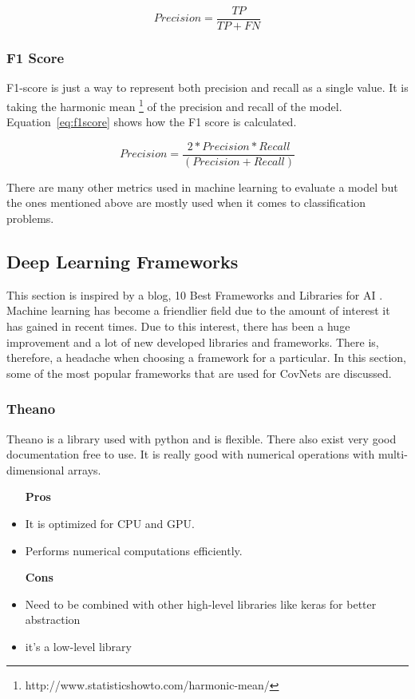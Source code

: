 \documentclass[12pt, a4paper,oneside]{report}
\begin{document}
\begin{equation}
Precision = \frac{TP}{TP + FN} \label{eq:recall}
\end{equation}

\subsubsection{F1 Score}
F1-score is just a way to represent both precision and recall as a single value. It is taking the harmonic mean \footnote{http://www.statisticshowto.com/harmonic-mean/} of the precision and recall of the model. Equation~\ref{eq:f1score} shows how the F1 score is calculated.

\begin{equation}
Precision = \frac{2 * Precision * Recall}{(Precision + Recall)} \label{eq:f1score}
\end{equation}

There are many other metrics used in machine learning to evaluate a model but the ones mentioned above are mostly used when it comes to classification problems.


\subsection{Deep Learning Frameworks}
This section is inspired by a blog, 10 Best Frameworks and Libraries for AI \cite{framework}.
Machine learning has become a friendlier field due to the amount of interest it has gained in recent times. Due to this interest, there has been a huge improvement and a lot of new developed libraries and frameworks. There is, therefore, a headache when choosing a framework for a particular. In this section, some of the most popular frameworks that are used for CovNets are discussed. 

\subsubsection{Theano}
Theano is a library used with python and is flexible. There also exist very good documentation free to use. It is really good with numerical operations with multi-dimensional arrays.

\begin{itemize}
	\item [\textbf{Pros}]
	\item It is optimized for CPU and GPU.
	\item Performs numerical computations efficiently.
		
	\item [\textbf{Cons}]
	\item Need to be combined with other high-level libraries like keras for better abstraction
	\item it's a low-level library 
\end{itemize}
\end{document}
